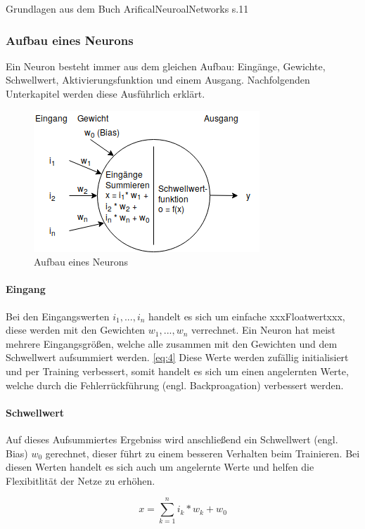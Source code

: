 Grundlagen aus dem Buch ArificalNeuroalNetworks s.11 


\subsubsection{Aufbau eines Neurons}
\label{Aufbau eines Neurons}
Ein Neuron besteht immer aus dem gleichen Aufbau: Eingänge, Gewichte, Schwellwert, Aktivierungsfunktion und einem Ausgang.
Nachfolgenden Unterkapitel werden diese Ausführlich erklärt.
\begin{figure}[htb]
  \centering  
  \includegraphics[scale=0.9]{img/neuron.png}
  \caption{Aufbau eines Neurons}
  \label{fig:neuron}
\end{figure}


\paragraph{Eingang}
Bei den Eingangswerten $i_1, ..., i_n$ handelt es sich um einfache xxxFloatwertxxx, diese werden mit den Gewichten $w_1, ..., w_n$ verrechnet. Ein Neuron hat meist mehrere Eingangsgrößen, welche alle zusammen mit den Gewichten und dem Schwellwert aufsummiert werden. \ref{eq:4} Diese Werte werden zufällig initialisiert und per Training verbessert, somit handelt es sich um einen angelernten Werte, welche durch die Fehlerrückführung (engl. Backproagation) verbessert werden.

\paragraph{Schwellwert}
Auf dieses Aufsummiertes Ergebniss wird anschließend ein Schwellwert (engl. Bias) $w_0$ gerechnet, dieser führt zu einem besseren Verhalten beim Trainieren. Bei diesen Werten handelt es sich auch um angelernte Werte und helfen die Flexibitlität der Netze zu erhöhen.

\begin{equation}
	x = \sum_{k=1}^n i_k * w_k + w_0 \label{eq:4}
\end{equation}

